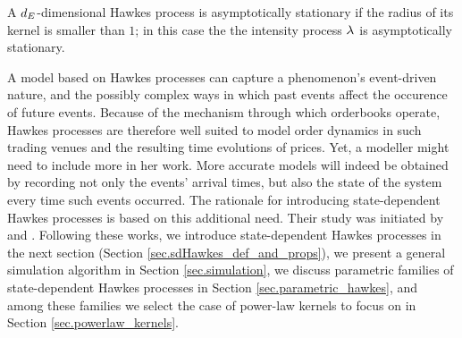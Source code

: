 \documentclass[10pt]{article}
\begin{document}
A $\numEventTypes$-dimensional Hawkes process is asymptotically stationary if the radius of its kernel is smaller than $1$; in this case the the intensity process $\intensity[ ]$ is asymptotically stationary.  

A model based on Hawkes processes can capture a phenomenon's event-driven nature, and the possibly complex ways in which past events affect the occurence of future events. Because of the mechanism through which orderbooks operate, Hawkes processes are therefore well suited to model order dynamics in such trading venues and the resulting time evolutions of prices. Yet, a modeller might need to include more in her work. More accurate models will indeed be obtained by recording not only the events' arrival times, but also the state of the system every time such events occurred. The rationale for introducing state-dependent Hawkes processes is based on this additional need. Their study was initiated by \citealp{MP20hyb} and \citealp{MP18sta}. Following these works, we introduce state-dependent Hawkes  processes in the next section (Section \ref{sec.sdHawkes_def_and_props}), we present a general simulation algorithm in Section \ref{sec.simulation},  we discuss parametric families of state-dependent Hawkes processes in Section \ref{sec.parametric_hawkes}, and among these families we select the case of power-law kernels to focus on in Section \ref{sec.powerlaw_kernels}.
\end{document}
